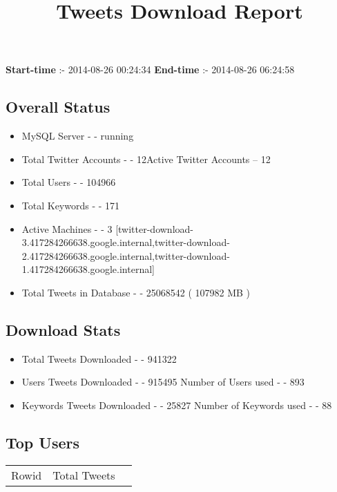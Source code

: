 \documentclass{article}\usepackage[T1]{fontenc}
\begin{document}
\title{\textbf{Tweets Download Report}}
               \date{}
                \maketitle
               \centerline{\textbf{Start-time} :- 2014-08-26 00:24:34 \hspace{40pt} \textbf{End-time} :- 2014-08-26 06:24:58}               \subsection*{Overall Status}                \begin{itemize}                \item MySQL Server - - running               \item Total Twitter Accounts - - 12\newline Active Twitter Accounts -- 12               \item Total Users - - 104966               \item Total Keywords - - 171               \item Active Machines - - 3 [twitter-download-3.417284266638.google.internal,twitter-download-2.417284266638.google.internal,twitter-download-1.417284266638.google.internal]               \item Total Tweets in Database - - 25068542 ( 107982 MB )               \end{itemize}               \subsection*{Download Stats}                \begin{itemize}                \item Total Tweets Downloaded - - 941322               \item Users Tweets Downloaded - - 915495 \newline Number of Users used - - 893               \item Keywords Tweets Downloaded - - 25827 \newline Number of Keywords used - - 88              \end{itemize}              \subsection*{Top Users}\begin{tabular}{|c|c|c|}         \hline         Rowid & Total Tweets \\ 

\end{tabular}
\end{document}
